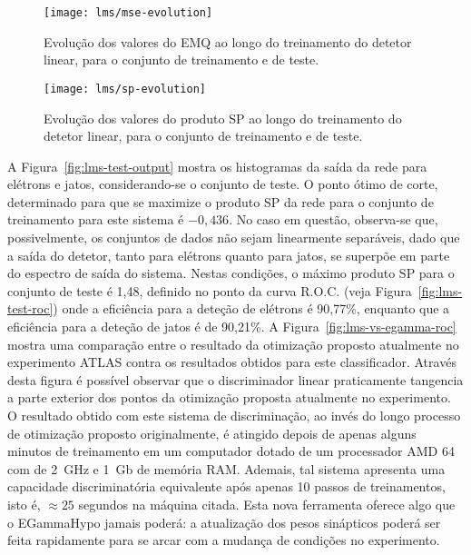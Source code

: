 \begin{figure}
\begin{center}
\texttt{[image: lms/mse-evolution]}
\end{center}
\caption{Evolução dos valores do EMQ ao longo do treinamento do detetor
linear, para o conjunto de treinamento e de teste.}
\label{fig:lms-mse-evo}
\end{figure}

\begin{figure}
\begin{center}
\texttt{[image: lms/sp-evolution]}
\end{center}
\caption{Evolução dos valores do produto SP ao longo do treinamento do detetor
linear, para o conjunto de treinamento e de teste.}
\label{fig:lms-sp-evo}
\end{figure}

A Figura~\ref{fig:lms-test-output} mostra os histogramas da saída da rede para
elétrons e jatos, considerando-se o conjunto de teste. O ponto ótimo de corte,
determinado para que se maximize o produto SP da rede para o conjunto de
treinamento para este sistema é $-0,436$. No caso em questão, observa-se que,
possivelmente, os conjuntos de dados não sejam linearmente separáveis, dado
que a saída do detetor, tanto para elétrons quanto para jatos, se superpõe em
parte do espectro de saída do sistema. Nestas condições, o máximo produto SP
para o conjunto de teste é 1,48, definido no ponto da curva R.O.C. (veja
Figura~\ref{fig:lms-test-roc}) onde a eficiência para a deteção de elétrons é
90,77\%, enquanto que a eficiência para a deteção de jatos é de 90,21\%. A
Figura~\ref{fig:lms-vs-egamma-roc} mostra uma comparação entre o resultado da
otimização proposto atualmente no experimento ATLAS contra os resultados
obtidos para este classificador. Através desta figura é possível observar que
o discriminador linear praticamente tangencia a parte exterior dos pontos da
otimização proposta atualmente no experimento. O resultado obtido com este
sistema de discriminação, ao invés do longo processo de otimização proposto
originalmente, é atingido depois de apenas alguns minutos de treinamento em um
computador dotado de um processador AMD 64 com  de 2~GHz e 1~Gb de
memória RAM. Ademais, tal sistema apresenta uma capacidade discriminatória
equivalente após apenas 10 passos de treinamentos, isto é, $\approx 25$
segundos na máquina citada. Esta nova ferramenta oferece algo que o EGammaHypo
jamais poderá: a atualização dos pesos sinápticos poderá ser feita rapidamente
para se arcar com a mudança de condições no experimento.

